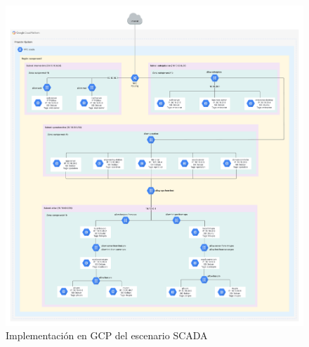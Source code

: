  \clearpage
  \begin{figure}[h]
  \centering
  \includegraphics[width=\textwidth]{../imgs/desarrollo/escenarios-de-red/SCADA/EscenarioSCADA.png}
  \caption{Implementación en GCP del escenario SCADA}
  \label{fig:scada-i}
  \end{figure}
  \clearpage
